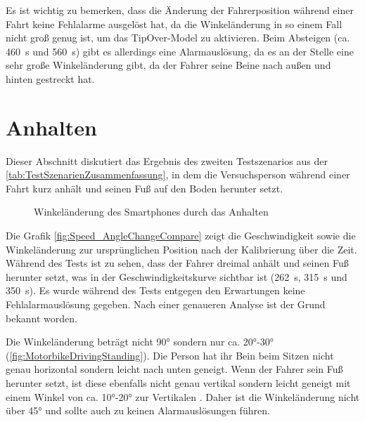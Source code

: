 Es ist wichtig zu bemerken, dass die Änderung der Fahrerposition während einer Fahrt keine Fehlalarme ausgelöst hat, da die Winkeländerung in so einem Fall nicht groß genug ist, um das \glqq TipOver\grqq{}-Model zu aktivieren. Beim Absteigen (ca. \SI{460}{\second} und \SI{560}{\second}) gibt es allerdings eine Alarmauslösung, da es an der Stelle eine sehr große Winkeländerung gibt, da der Fahrer seine Beine nach außen und hinten gestreckt hat.
\section{Anhalten}
Dieser Abschnitt diskutiert das Ergebnis des zweiten Testszenarios aus der \autoref{tab:TestSzenarienZusammenfassung}, in dem die Versuchsperson während einer Fahrt kurz anhält und seinen Fuß auf den Boden herunter setzt.

\begin{figure}[htpb]
	\centering
	\caption{Winkeländerung des Smartphones durch das Anhalten}
	\label{fig:Speed_AngleChangeCompare}
\end{figure}
Die Grafik \autoref{fig:Speed_AngleChangeCompare} zeigt die Geschwindigkeit sowie die Winkeländerung zur ursprünglichen Position nach der Kalibrierung über die Zeit.
Während des Tests ist zu sehen, dass der Fahrer dreimal anhält und seinen Fuß herunter setzt, was in der Geschwindigkeitskurve sichtbar ist (\SI{262}{\second}, \SI{315}{\second} und \SI{350}{\second}). Es wurde während des Tests entgegen den Erwartungen keine Fehlalarmauslösung gegeben. Nach einer genaueren Analyse ist der Grund bekannt worden.

Die Winkeländerung beträgt nicht \ang{90} sondern nur ca. \ang{20}-\ang{30} (\autoref{fig:MotorbikeDrivingStanding}). Die Person hat ihr Bein beim Sitzen nicht genau horizontal sondern leicht nach unten geneigt. Wenn der Fahrer sein Fuß herunter setzt, ist diese ebenfalls nicht genau vertikal sondern leicht geneigt mit einem Winkel von ca. \ang{10}-\ang{20} zur Vertikalen . Daher ist die Winkeländerung nicht über \ang{45} und sollte auch zu keinen Alarmauslösungen führen.

